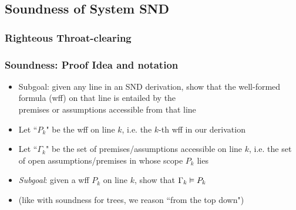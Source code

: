 \subsection{Soundness of System SND}

\subsubsection{Righteous Throat-clearing}

\begin{frame}
\frametitle{Soundness: Proof Idea and notation}

\begin{itemize}[<+->]

\item Subgoal: given any line in an SND derivation, show that the well-formed formula (wff) on that line is entailed by the \\ premises or assumptions accessible from that line


\item Let ``\emph{$P_k$}" be the wff on line $k$, i.e. the $k$-th wff in our derivation

\item Let ``\emph{$\Gamma_k$}" be the set of premises/assumptions accessible on line $k$, i.e. the set of open assumptions/premises in whose scope $P_k$ lies

\item \emph{Subgoal}: given a wff $P_k$ on line $k$, show that $\Gamma_k \vDash P_k$

\item (like with soundness for trees, we reason ``from the top down")

\end{itemize}
\end{frame}


